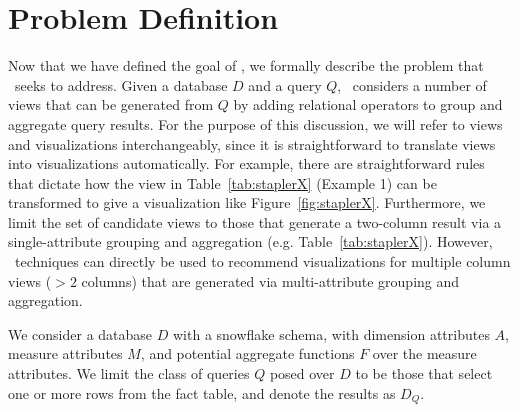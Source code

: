 \chapter{Problem Definition}
\label{sec:problem_statement}

Now that we have defined the goal of \SeeDB, we formally describe the problem
that \SeeDB\ seeks to address. Given a database $D$ and a query $Q$, \SeeDB\
considers a number of views that can be generated from $Q$ by adding relational
operators to group and aggregate query results.
For the purpose of this discussion, we will refer to views and visualizations
interchangeably, since it is straightforward to translate views into
visualizations automatically. For example, there are straightforward rules that
dictate how the view in Table~\ref{tab:staplerX} (Example 1) can be transformed
to give a visualization like Figure~\ref{fig:staplerX}.
Furthermore, we limit the set of candidate views to those
that generate a two-column result via a single-attribute grouping and
aggregation (e.g. Table~\ref{tab:staplerX}). However, \SeeDB\ techniques can
directly be used to recommend visualizations for
multiple column views ($> 2$ columns) that are generated via multi-attribute
grouping and aggregation.


We consider a database $D$ with a snowflake schema,
with dimension attributes $A$, measure attributes $M$, and potential
aggregate functions $F$ over the measure attributes.
We limit the class of queries $Q$ posed over $D$ to be
those that select one or more rows from the fact table, and denote the results
as $D_Q$. 

